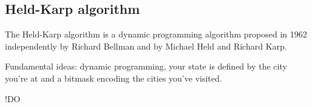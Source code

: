 \subsection{Held-Karp algorithm} \label{algorithm-tsp-heldkarp}
The Held-Karp algorithm is a dynamic programming algorithm proposed in 1962 independently by Richard Bellman and by Michael Held and Richard Karp.\par
Fundamental ideas: dynamic programming, your state is defined by the city you're at and a bitmask encoding the cities you've visited.\par
!DO
